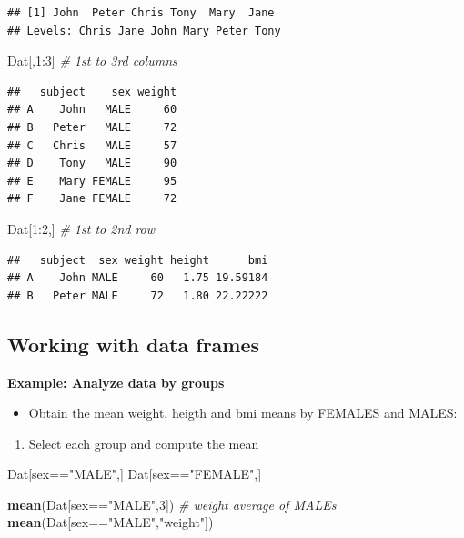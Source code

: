 \documentclass[]{article}
\def\tightlist{}
\newenvironment{Shaded}{\begin{snugshade}}{\end{snugshade}}
\newcommand{\KeywordTok}[1]{\textcolor[rgb]{0.13,0.29,0.53}{\textbf{{#1}}}}
\newcommand{\DecValTok}[1]{\textcolor[rgb]{0.00,0.00,0.81}{{#1}}}
\newcommand{\StringTok}[1]{\textcolor[rgb]{0.31,0.60,0.02}{{#1}}}
\newcommand{\CommentTok}[1]{\textcolor[rgb]{0.56,0.35,0.01}{\textit{{#1}}}}
\newcommand{\NormalTok}[1]{{#1}}
\numberwithin{equation}{section}
\begin{document}
\begin{verbatim}
## [1] John  Peter Chris Tony  Mary  Jane 
## Levels: Chris Jane John Mary Peter Tony
\end{verbatim}

\begin{Shaded}
\begin{Highlighting}[]
\NormalTok{Dat[,}\DecValTok{1}\NormalTok{:}\DecValTok{3}\NormalTok{]   }\CommentTok{# 1st to 3rd columns}
\end{Highlighting}
\end{Shaded}

\begin{verbatim}
##   subject    sex weight
## A    John   MALE     60
## B   Peter   MALE     72
## C   Chris   MALE     57
## D    Tony   MALE     90
## E    Mary FEMALE     95
## F    Jane FEMALE     72
\end{verbatim}

\begin{Shaded}
\begin{Highlighting}[]
\NormalTok{Dat[}\DecValTok{1}\NormalTok{:}\DecValTok{2}\NormalTok{,]   }\CommentTok{# 1st to 2nd row}
\end{Highlighting}
\end{Shaded}

\begin{verbatim}
##   subject  sex weight height      bmi
## A    John MALE     60   1.75 19.59184
## B   Peter MALE     72   1.80 22.22222
\end{verbatim}

\subsection{Working with data frames}\label{working-with-data-frames}

\textbf{Example: Analyze data by groups}

\begin{itemize}
\tightlist
\item
  Obtain the mean weight, heigth and bmi means by FEMALES and MALES:
\end{itemize}

\begin{enumerate}
\def\labelenumi{\arabic{enumi}.}
\tightlist
\item
  Select each group and compute the mean
\end{enumerate}

\begin{Shaded}
\begin{Highlighting}[]
\NormalTok{Dat[sex==}\StringTok{"MALE"}\NormalTok{,]}
\NormalTok{Dat[sex==}\StringTok{"FEMALE"}\NormalTok{,]}

\KeywordTok{mean}\NormalTok{(Dat[sex==}\StringTok{"MALE"}\NormalTok{,}\DecValTok{3}\NormalTok{])  }\CommentTok{# weight average of MALEs}
\KeywordTok{mean}\NormalTok{(Dat[sex==}\StringTok{"MALE"}\NormalTok{,}\StringTok{"weight"}\NormalTok{])}
\end{Highlighting}
\end{Shaded}
\end{document}
